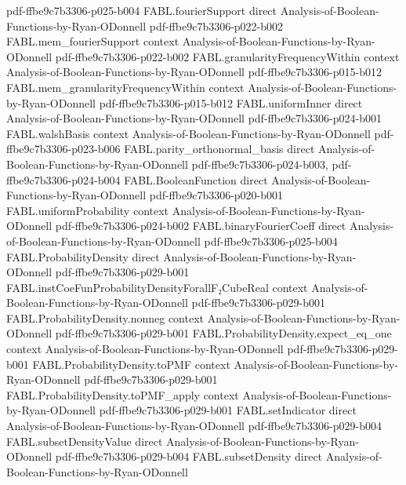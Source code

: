 \begin{theorem}
  {pdf-ffbe9c7b3306-p025-b004}
\proofstep
  {FABL.fourierSupport}
  {direct}
  {Analysis-of-Boolean-Functions-by-Ryan-ODonnell}
  {pdf-ffbe9c7b3306-p022-b002}
\proofstep
  {FABL.mem_fourierSupport}
  {context}
  {Analysis-of-Boolean-Functions-by-Ryan-ODonnell}
  {pdf-ffbe9c7b3306-p022-b002}
\proofstep
  {FABL.granularityFrequencyWithin}
  {context}
  {Analysis-of-Boolean-Functions-by-Ryan-ODonnell}
  {pdf-ffbe9c7b3306-p015-b012}
\proofstep
  {FABL.mem_granularityFrequencyWithin}
  {context}
  {Analysis-of-Boolean-Functions-by-Ryan-ODonnell}
  {pdf-ffbe9c7b3306-p015-b012}
\proofstep
  {FABL.uniformInner}
  {direct}
  {Analysis-of-Boolean-Functions-by-Ryan-ODonnell}
  {pdf-ffbe9c7b3306-p024-b001}
\proofstep
  {FABL.walshBasis}
  {context}
  {Analysis-of-Boolean-Functions-by-Ryan-ODonnell}
  {pdf-ffbe9c7b3306-p023-b006}
\proofstep
  {FABL.parity_orthonormal_basis}
  {direct}
  {Analysis-of-Boolean-Functions-by-Ryan-ODonnell}
  {pdf-ffbe9c7b3306-p024-b003,
    pdf-ffbe9c7b3306-p024-b004}
\proofstep
  {FABL.BooleanFunction}
  {direct}
  {Analysis-of-Boolean-Functions-by-Ryan-ODonnell}
  {pdf-ffbe9c7b3306-p020-b001}
\proofstep
  {FABL.uniformProbability}
  {context}
  {Analysis-of-Boolean-Functions-by-Ryan-ODonnell}
  {pdf-ffbe9c7b3306-p024-b002}
\proofstep
  {FABL.binaryFourierCoeff}
  {direct}
  {Analysis-of-Boolean-Functions-by-Ryan-ODonnell}
  {pdf-ffbe9c7b3306-p025-b004}
\proofstep
  {FABL.ProbabilityDensity}
  {direct}
  {Analysis-of-Boolean-Functions-by-Ryan-ODonnell}
  {pdf-ffbe9c7b3306-p029-b001}
\proofstep
  {FABL.instCoeFunProbabilityDensityForallF₂CubeReal}
  {context}
  {Analysis-of-Boolean-Functions-by-Ryan-ODonnell}
  {pdf-ffbe9c7b3306-p029-b001}
\proofstep
  {FABL.ProbabilityDensity.nonneg}
  {context}
  {Analysis-of-Boolean-Functions-by-Ryan-ODonnell}
  {pdf-ffbe9c7b3306-p029-b001}
\proofstep
  {FABL.ProbabilityDensity.expect_eq_one}
  {context}
  {Analysis-of-Boolean-Functions-by-Ryan-ODonnell}
  {pdf-ffbe9c7b3306-p029-b001}
\proofstep
  {FABL.ProbabilityDensity.toPMF}
  {context}
  {Analysis-of-Boolean-Functions-by-Ryan-ODonnell}
  {pdf-ffbe9c7b3306-p029-b001}
\proofstep
  {FABL.ProbabilityDensity.toPMF_apply}
  {context}
  {Analysis-of-Boolean-Functions-by-Ryan-ODonnell}
  {pdf-ffbe9c7b3306-p029-b001}
\proofstep
  {FABL.setIndicator}
  {direct}
  {Analysis-of-Boolean-Functions-by-Ryan-ODonnell}
  {pdf-ffbe9c7b3306-p029-b004}
\proofstep
  {FABL.subsetDensityValue}
  {direct}
  {Analysis-of-Boolean-Functions-by-Ryan-ODonnell}
  {pdf-ffbe9c7b3306-p029-b004}
\proofstep
  {FABL.subsetDensity}
  {direct}
  {Analysis-of-Boolean-Functions-by-Ryan-ODonnell}

\end{theorem}
